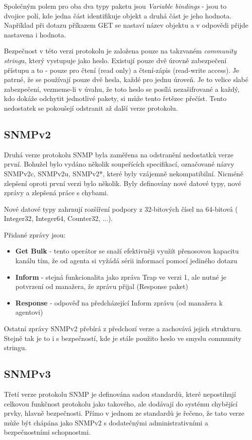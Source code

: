Společným polem pro oba dva typy paketu jsou \textit{Variable bindings} - jsou to dvojice polí, kde jedna část identifikuje objekt a druhá část je jeho hodnota. Například
při dotazu příkazem GET se nastaví název objektu a v odpovědi přijde nastavena i hodnota.

Bezpečnost v této verzi protokolu je založena pouze na takzvaném \textit{community string}u, který vystupuje jako heslo. Existují pouze dvě úrovně zabezpečení
přístupu a to - pouze pro čtení (read only) a čtení-zápis (read-write access). Je patrné, že se používají pouze dvě hesla, každé pro jednu úroveň. Je to velice slabé
zabezpečení, vezmeme-li v úvahu, že toto heslo se posílá nezašifrované a každý, kdo dokáže odchytit jednotlivé pakety, si může tento řetězec přečíst. Tento nedostatek
se pokoušejí odstranit až další verze protokolu.

\subsection*{SNMPv2}
Druhá verze protokolu SNMP byla zaměřena na odstranění nedostatků verze první. Bohužel bylo vydáno několik soupeřících specifikací, označované názvy SNMPv2c, SNMPv2u, SNMPv2*, které
byly vzájemně nekompatibilní. Nicméně zlepšení oproti první verzi bylo několik. Byly definovány nové datové typy, nové zprávy a zlepšená práce s chybami.

Nové datové typy zahrnují rozšíření podpory z 32-bitových čísel na 64-bitová ( Integer32, Integer64, Counter32, ...). 

Přidané zprávy jsou:
\begin{itemize}
	\item \textbf{Get Bulk} - tento operátor se snaží efektivněji využít přenosovou kapacitu kanálu tím, že od agenta si vyžádá sérii informací pomocí jediného dotazu
	\item \textbf{Inform} - stejná funkcionalita jako zpráva Trap ve verzi 1, ale nutné je potvrzení od manažera, že zprávu přijal (Response paket)
	\item \textbf{Response} - odpověď na předcházející Inform zprávu (od manažera k agentovi)
\end{itemize}

Ostatní zprávy SNMPv2 přebírá z předchozí verze a zachovává jejich strukturu. Stejně tak je to i s bezpečností, kde je stále použito heslo ve smyslu community stringu.

\subsection*{SNMPv3}
Třetí verze protokolu SNMP je definována sadou standardů, které nepostihují celkovou funkčnost protokolu jako takového, ale 
dodávají do systému chybějící prvky, hlavně bezpečnosti. Přímo v jednom ze standardů \cite{rfc2570} je řečeno, že tato verze může být chápána jako 
SNMPv2 s dodatečnými administrativními a bezpečnostními schopnostmi.

